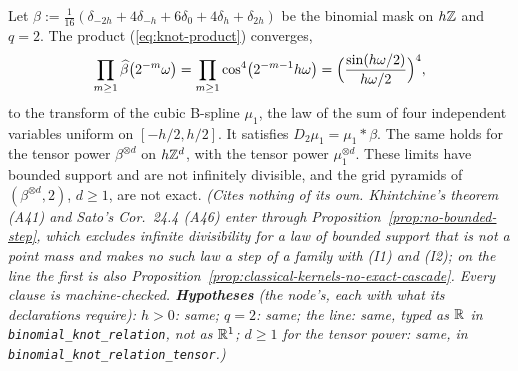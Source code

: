 \begin{proposition}
\label{prop:binomial-knot-relation}
\leanok
Let $\beta := \tfrac{1}{16}(\delta_{-2h} + 4\delta_{-h} + 6\delta_0 + 4\delta_h + \delta_{2h})$ be the
binomial mask on $h\mathbb{Z}$ and $q = 2$. The product (\ref{eq:knot-product}) converges,
\[
\prod_{m \ge 1}\widehat{\beta}\bigl(2^{-m}\omega\bigr) = \prod_{m \ge 1}\cos^4\bigl(2^{-m-1}h\omega\bigr)
= \Bigl(\frac{\sin(h\omega/2)}{h\omega/2}\Bigr)^4 ,
\]
to the transform of the cubic B-spline $\mu_1$, the law of the sum of four independent variables
uniform on $[-h/2, h/2]$. It satisfies $D_2\mu_1 = \mu_1 * \beta$. The same holds for the tensor
power $\beta^{\otimes d}$ on $h\mathbb{Z}^d$, with the tensor power $\mu_1^{\otimes d}$. These limits have
bounded support and are not infinitely divisible, and the grid pyramids of $(\beta^{\otimes d}, 2)$,
$d \ge 1$, are not exact.
\statusT\quad\emph{(Cites nothing of its own. Khintchine's theorem (A41) and Sato's Cor.~24.4
(A46) enter through Proposition~\ref{prop:no-bounded-step}, which excludes infinite divisibility
for a law of bounded support that is not a point mass and makes no such law a step of a family with
(I1) and (I2); on the line the first is also
Proposition~\ref{prop:classical-kernels-no-exact-cascade}. Every clause is machine-checked.
\textbf{Hypotheses} (the node's, each with what its declarations require): $h > 0$: same; $q = 2$: same;
the line: same, typed as $\mathbb{R}$ in \texttt{binomial\_knot\_relation}, not as $\mathbb{R}^1$; $d \ge 1$ for
the tensor power: same, in \texttt{binomial\_knot\_relation\_tensor}.)}
\end{proposition}

